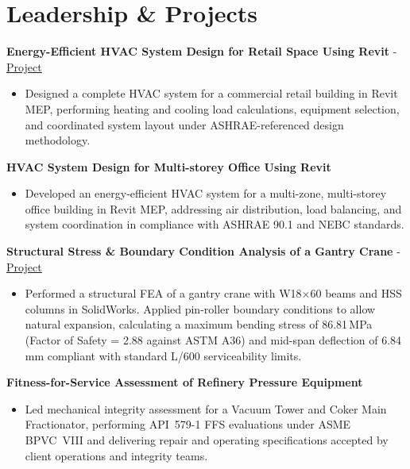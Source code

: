 \documentclass[10pt, letterpaper]{article}
\newcommand{\projhead}[1]{\vspace{5pt}\textbf{#1}\par\vspace{1pt}}
\newcommand{\projheadlink}[3]{\vspace{5pt}\textbf{#1} - \href{#3}{\textcolor{linkblue}{\underline{#2}}}\par\vspace{1pt}}
\begin{document}
\section*{Leadership \& Projects}

\projheadlink{Energy-Efficient HVAC System Design for Retail Space Using Revit}{Project}{https://www.linkedin.com/posts/jaykumar-prajapati_hvacdesign-mechanicalengineering-learningjourney-ugcPost-7308550562596237315-Dxny}
\begin{itemize}
  \item Designed a complete HVAC system for a commercial retail building in Revit MEP, performing heating and cooling load calculations, equipment selection, and coordinated system layout under ASHRAE-referenced design methodology.
\end{itemize}

\projhead{HVAC System Design for Multi-storey Office Using Revit}
\begin{itemize}
  \item Developed an energy-efficient HVAC system for a multi-zone, multi-storey office building in Revit MEP, addressing air distribution, load balancing, and system coordination in compliance with ASHRAE 90.1 and NEBC standards.
\end{itemize}

\projheadlink{Structural Stress \& Boundary Condition Analysis of a Gantry Crane}{Project}{https://www.linkedin.com/posts/jaykumar-prajapati_mechanicalengineering-finiteelementanalysis-activity-7481037256577912833-8sKD}
\begin{itemize}
  \item Performed a structural FEA of a gantry crane with W18$\times$60 beams and HSS columns in SolidWorks. Applied pin-roller boundary conditions to allow natural expansion, calculating a maximum bending stress of 86.81\,MPa (Factor of Safety = 2.88 against ASTM A36) and mid-span deflection of 6.84\,mm compliant with standard L/600 serviceability limits.
\end{itemize}

\projhead{Fitness-for-Service Assessment of Refinery Pressure Equipment}
\begin{itemize}
  \item Led mechanical integrity assessment for a Vacuum Tower and Coker Main Fractionator, performing API~579-1 FFS evaluations under ASME BPVC~VIII and delivering repair and operating specifications accepted by client operations and integrity teams.
\end{itemize}
\end{document}
